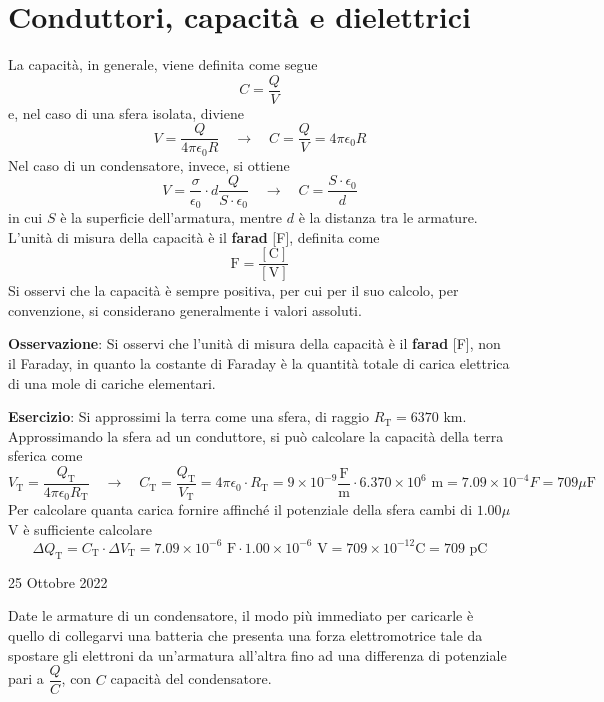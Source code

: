 \documentclass[a4paper]{extarticle}
\begin{document}
\section{Conduttori, capacità e dielettrici}
La capacità, in generale, viene definita come segue
\[C=\frac{Q}{V}\]
e, nel caso di una sfera isolata, diviene
\[V = \frac{Q}{4 \pi \epsilon_0 R} \hspace{1em} \rightarrow \hspace{1em} C = \frac{Q}{V} = 4 \pi \epsilon_0 R\]
Nel caso di un condensatore, invece, si ottiene
\[V=\frac{\sigma}{\epsilon_0} \cdot d \frac{Q}{S \cdot \epsilon_0} \hspace{1em} \rightarrow \hspace{1em} C = \frac{S \cdot \epsilon_0}{d}\]
in cui $S$ è la superficie dell'armatura, mentre $d$ è la distanza tra le armature.\\
L'unità di misura della capacità è il \textbf{farad} [F], definita come
\[\text{F} = \frac{[\text{C}]}{[\text{V}]}\]
Si osservi che la capacità è sempre positiva, per cui per il suo calcolo, per convenzione, si considerano generalmente i valori assoluti.

\vspace{1em}
\noindent
\textbf{Osservazione}: Si osservi che l'unità di misura della capacità è il \textbf{farad} [F], non il Faraday, in quanto la costante di Faraday è la quantità totale di carica elettrica di una mole di cariche elementari.

\vspace{1em}
\noindent
\textbf{Esercizio}: Si approssimi la terra come una sfera, di raggio $R_\text{T} = 6370$ km. Approssimando la sfera ad un conduttore, si può calcolare la capacità della terra sferica come
\[V_\text{T} = \frac{Q_\text{T}}{4 \pi \epsilon_0 R_\text{T}} \hspace{1em} \rightarrow \hspace{1em} C_\text{T} = \frac{Q_\text{T}}{V_\text{T}} = 4 \pi \epsilon_0 \cdot R_\text{T} = 9 \times 10^{-9} \dfrac{\text{F}}{\text{m}} \cdot 6.370 \times 10^6 \text{ m} = 7.09 \times 10^{-4} F = 709 \mu\text{F}\]
Per calcolare quanta carica fornire affinché il potenziale della sfera cambi di $1.00 \mu$V è sufficiente calcolare
\[\Delta Q_\text{T} = C_\text{T} \cdot \Delta V_\text{T} = 7.09 \times 10^{-6} \text{ F} \cdot 1.00 \times 10^{-6} \text{ V} = 709 \times 10^{-12} \text{C} = 709 \text{ pC}\]


\newpage
\noindent
\begin{center}
  25 Ottobre 2022
\end{center}
Date le armature di un condensatore, il modo più immediato per caricarle è quello di collegarvi una batteria che presenta una forza elettromotrice tale da spostare gli elettroni da un'armatura all'altra fino ad una differenza di potenziale pari a $\dfrac{Q}{C}$, con $C$ capacità del condensatore.
\end{document}
